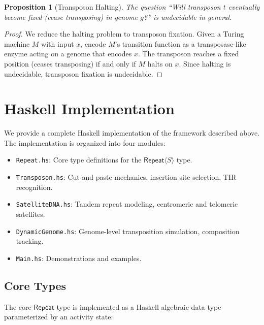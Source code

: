 \documentclass[12pt,a4paper]{article}
\newtheorem{proposition}[theorem]{Proposition}
\newcommand{\Repeat}{\mathsf{Repeat}}
\begin{document}
\begin{proposition}[Transposon Halting]\label{prop:halting}
The question ``Will transposon $t$ eventually become fixed (cease transposing) in
genome $g$?'' is undecidable in general.
\end{proposition}

\begin{proof}
We reduce the halting problem to transposon fixation. Given a Turing machine $M$
with input $x$, encode $M$'s transition function as a transposase-like enzyme acting
on a genome that encodes $x$. The transposon reaches a fixed position (ceases
transposing) if and only if $M$ halts on $x$. Since halting is undecidable,
transposon fixation is undecidable.
\end{proof}


\section{Haskell Implementation}\label{sec:implementation}

We provide a complete Haskell implementation of the framework described above. The
implementation is organized into four modules:

\begin{itemize}
  \item \texttt{Repeat.hs}: Core type definitions for the $\Repeat\langle S \rangle$ type.
  \item \texttt{Transposon.hs}: Cut-and-paste mechanics, insertion site selection, TIR recognition.
  \item \texttt{SatelliteDNA.hs}: Tandem repeat modeling, centromeric and telomeric satellites.
  \item \texttt{DynamicGenome.hs}: Genome-level transposition simulation, composition tracking.
  \item \texttt{Main.hs}: Demonstrations and examples.
\end{itemize}

\subsection{Core Types}

The core $\Repeat$ type is implemented as a Haskell algebraic data type parameterized
by an activity state:
\end{document}
